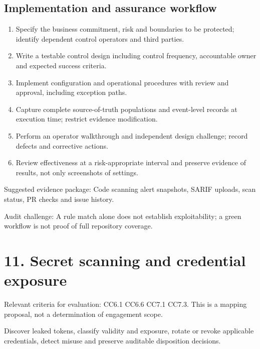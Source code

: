\documentclass[10pt,oneside]{report}
\begin{document}
\subsection{Implementation and assurance workflow}
\begin{enumerate}
\item Specify the business commitment, risk and boundaries to be protected; identify dependent control operators and third parties.
\item Write a testable control design including control frequency, accountable owner and expected success criteria.
\item Implement configuration and operational procedures with review and approval, including exception paths.
\item Capture complete source-of-truth populations and event-level records at execution time; restrict evidence modification.
\item Perform an operator walkthrough and independent design challenge; record defects and corrective actions.
\item Review effectiveness at a risk-appropriate interval and preserve evidence of results, not only screenshots of settings.
\end{enumerate}

Suggested evidence package: Code scanning alert snapshots, SARIF uploads, scan status, PR checks and issue history.

Audit challenge: A rule match alone does not establish exploitability; a green workflow is not proof of full repository coverage.

\section{11. Secret scanning and credential exposure}
Relevant criteria for evaluation: CC6.1 CC6.6 CC7.1 CC7.3. This is a mapping proposal, not a determination of engagement scope.

\begin{engineeringbox}
Discover leaked tokens, classify validity and exposure, rotate or revoke applicable credentials, detect misuse and preserve auditable disposition decisions.
\end{engineeringbox}
\end{document}
